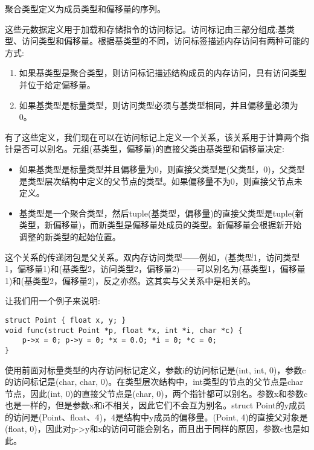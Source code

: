 聚合类型定义为成员类型和偏移量的序列。\par

这些元数据定义用于加载和存储指令的访问标记。访问标记由三部分组成:基类型、访问类型和偏移量。根据基类型的不同，访问标签描述内存访问有两种可能的方式:\par

\begin{enumerate}
	\item 如果基类型是聚合类型，则访问标记描述结构成员的内存访问，具有访问类型并位于给定偏移量。
	\item 如果基类型是标量类型，则访问类型必须与基类型相同，并且偏移量必须为0。
\end{enumerate}

有了这些定义，我们现在可以在访问标记上定义一个关系，该关系用于计算两个指针是否可以别名。元组(基类型，偏移量)的直接父类由基类型和偏移量决定:\par

\begin{itemize}
	\item 如果基类型是标量类型并且偏移量为0，则直接父类型是(父类型，0)，父类型是类型层次结构中定义的父节点的类型。如果偏移量不为0，则直接父节点未定义。
	\item 基类型是一个聚合类型，然后tuple(基类型，偏移量)的直接父类型是tuple(新类型，新偏移量)，而新类型是偏移量处成员的类型。新偏移量会根据新开始调整的新类型的起始位置。
\end{itemize}

这个关系的传递闭包是父关系。双内存访问类型——例如，(基类型1，访问类型1，偏移量1)和(基类型2，访问类型2，偏移量2)——可以别名为(基类型1，偏移量1)和(基类型2，偏移量2)，反之亦然。这其实与父关系中是相关的。\par

让我们用一个例子来说明:\par

\begin{lstlisting}[caption={}]
struct Point { float x, y; }
void func(struct Point *p, float *x, int *i, char *c) {
	p->x = 0; p->y = 0; *x = 0.0; *i = 0; *c = 0; 
}
\end{lstlisting}

使用前面对标量类型的内存访问标记定义，参数i的访问标记是(int, int, 0)，参数c的访问标记是(char, char, 0)。在类型层次结构中，int类型的节点的父节点是char节点，因此(int, 0)的直接父节点是(char, 0)，两个指针都可以别名。参数x和参数c也是一样的，但是参数x和i不相关，因此它们不会互为别名。struct Point的y成员的访问是(Point、float、4)，4是结构中y成员的偏移量。(Point, 4)的直接父对象是(float, 0)，因此对p->y和x的访问可能会别名，而且出于同样的原因，参数c也是如此。\par

